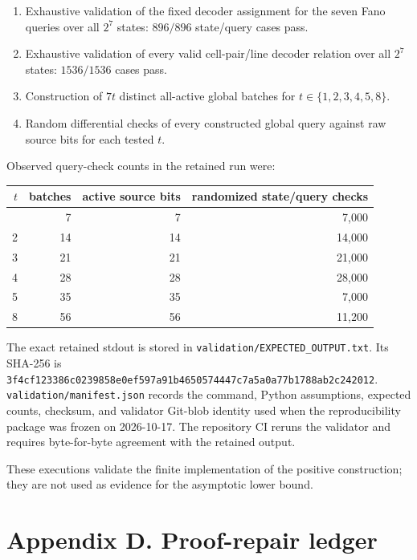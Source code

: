 \documentclass[
]{article}
\providecommand{\tightlist}{%
  \setlength{\itemsep}{0pt}\setlength{\parskip}{0pt}}
\begin{document}
\begin{enumerate}
\def\labelenumi{\arabic{enumi}.}
\tightlist
\item
  Exhaustive validation of the fixed decoder assignment for the seven
  Fano queries over all \(2^7\) states: \(896/896\) state/query cases
  pass.
\item
  Exhaustive validation of every valid cell-pair/line decoder relation
  over all \(2^7\) states: \(1536/1536\) cases pass.
\item
  Construction of \(7t\) distinct all-active global batches for
  \(t\in\{1,2,3,4,5,8\}\).
\item
  Random differential checks of every constructed global query against
  raw source bits for each tested \(t\).
\end{enumerate}

Observed query-check counts in the retained run were:

\begin{longtable}[]{@{}rrrr@{}}
\toprule\noalign{}
\(t\) & batches & active source bits & randomized state/query checks \\
\midrule\noalign{}
\endhead
\bottomrule\noalign{}
\endlastfoot
1 & 7 & 7 & 7,000 \\
2 & 14 & 14 & 14,000 \\
3 & 21 & 21 & 21,000 \\
4 & 28 & 28 & 28,000 \\
5 & 35 & 35 & 7,000 \\
8 & 56 & 56 & 11,200 \\
\end{longtable}

The exact retained stdout is stored in
\texttt{validation/EXPECTED\_OUTPUT.txt}. Its SHA-256 is
\texttt{3f4cf123386c0239858e0ef597a91b4650574447c7a5a0a77b1788ab2c242012}.
\texttt{validation/manifest.json} records the command, Python
assumptions, expected counts, checksum, and validator Git-blob identity
used when the reproducibility package was frozen on 2026-10-17. The
repository CI reruns the validator and requires byte-for-byte agreement
with the retained output.

These executions validate the finite implementation of the positive
construction; they are not used as evidence for the asymptotic lower
bound.

\hypertarget{appendix-d.-proof-repair-ledger}{%
\section{Appendix D. Proof-repair
ledger}\label{appendix-d.-proof-repair-ledger}}
\end{document}
